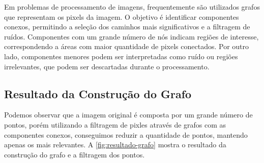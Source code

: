 Em problemas de processamento de imagens, frequentemente são utilizados grafos que representam os pixels da imagem. O objetivo é identificar componentes conexos, permitindo a seleção dos caminhos mais significativos e a filtragem de ruídos. Componentes com um grande número de nós indicam regiões de interesse, correspondendo a áreas com maior quantidade de pixels conectados. Por outro lado, componentes menores podem ser interpretadas como ruído ou regiões irrelevantes, que podem ser descartadas durante o processamento.

\subsection{Resultado da Construção do Grafo}
\label{sec:resultado-construcao-grafo}

Podemos observar que a imagem original é composta por um grande número de pontos, porém utilizando a filtragem de pixles através de grafos com as componentes conexos, conseguimos reduzir a quantidade de pontos, mantendo apenas os mais relevantes. A \autoref{fig:resultado-grafo} mostra o resultado da construção do grafo e a filtragem dos pontos.

